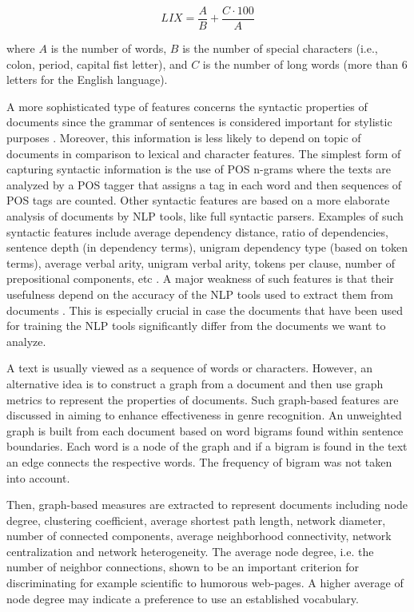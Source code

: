 \begin{equation} \label{chap:relevant_work:eq:LIX}
	LIX = \frac{A}{B} + \frac{C \cdot 100}{A}
\end{equation}

\nointend where $A$ is the number of words, $B$ is the number of special characters (i.e., colon, period, capital fist letter), and $C$ is the number of long words (more than 6 letters for the English language). 

A more sophisticated type of features concerns the syntactic properties of documents since the grammar of sentences is considered important for stylistic purposes . Moreover, this information is less likely to depend on topic of documents in comparison to lexical and character features. The simplest form of capturing syntactic information is the use of POS n-grams where the texts are analyzed by a POS tagger that assigns a tag in each word and then sequences of POS tags are counted. Other syntactic features are based on a more elaborate analysis of documents by NLP tools, like full syntactic parsers. Examples of such syntactic features include average dependency distance, ratio of dependencies, sentence depth (in dependency terms), unigram dependency type (based on token terms), average verbal arity, unigram verbal arity, tokens per clause, number of prepositional components, etc . A major weakness of such features is that their usefulness depend on the accuracy of the NLP tools used to extract them from documents . This is especially crucial in case the documents that have been used for training the NLP tools significantly differ from the documents we want to analyze.

A text is usually viewed as a sequence of words or characters. However, an alternative idea is to construct a graph from a document and then use graph metrics to represent the properties of documents. Such graph-based features are discussed in \parencite{nabhan2016graph} aiming to enhance effectiveness in genre recognition. An unweighted graph is built from each document based on word bigrams found within sentence boundaries. Each word is a node of the graph and if a bigram is found in the text an edge connects the respective words. The frequency of bigram was not taken into account. 

Then, graph-based measures are extracted to represent documents including node degree, clustering coefficient, average shortest path length, network diameter, number of connected components, average neighborhood connectivity, network centralization and network heterogeneity.  The average node degree, i.e. the number of neighbor connections, shown  to be an important criterion for discriminating for example scientific to humorous web-pages. A higher average of node degree may indicate a preference to use an established vocabulary.

